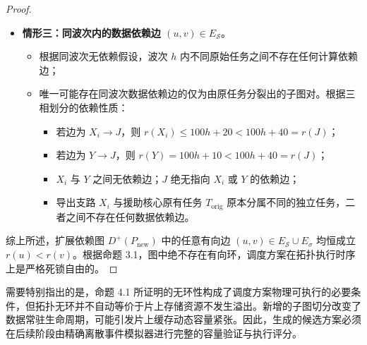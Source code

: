 \documentclass[anonymous,notoc]{gmcm2026}
\providecommand{\tightlist}{\setlength{\itemsep}{0pt}\setlength{\parskip}{0pt}}
\begin{document}
\begin{proof}
\begin{itemize}
  \begin{itemize}
  \tightlist
  \item
    在援助核心上，调度序列为 \(X_1 \to X_2 \to \cdots \to X_m \to T_{\mathrm{orig}}\)。根据标号赋值，显然有 \(r(X_1) < r(X_2) < \cdots < r(X_m) < r(T_{\mathrm{orig}}) = 100h + 30\)；
  \item
    在捐赠核心上，调度序列为 \(Y \to J\)。根据定义，\(r(Y) = 100h + 10 < r(J) = 100h + 40\)；
  \item
    其余核心在波次 \(h\) 内至多只有一个任务，不存在同波次调度边。
  \end{itemize}
\item
  \textbf{情形三：同波次内的数据依赖边 \((u, v) \in E_{\mathcal{S}}\)}。

  \begin{itemize}
  \tightlist
  \item
    根据同波次无依赖假设，波次 \(h\) 内不同原始任务之间不存在任何计算依赖边；
  \item
    唯一可能存在同波次数据依赖边的仅为由原任务分裂出的子图对。根据三相划分的依赖性质：

    \begin{itemize}
    \tightlist
    \item
      若边为 \(X_i \to J\)，则 \(r(X_i) \le 100h + 20 < 100h + 40 = r(J)\)；
    \item
      若边为 \(Y \to J\)，则 \(r(Y) = 100h + 10 < 100h + 40 = r(J)\)；
    \item
      \(X_i\) 与 \(Y\) 之间无依赖边；\(J\) 绝无指向 \(X_i\) 或 \(Y\) 的依赖边；
    \item
      导出支路 \(X_i\) 与援助核心原有任务 \(T_{\mathrm{orig}}\) 原本分属不同的独立任务，二者之间不存在任何数据依赖边。
    \end{itemize}
  \end{itemize}
\end{itemize}

综上所述，扩展依赖图 \(D^+(P_{\mathrm{new}})\) 中的任意有向边 \((u, v) \in E_{\mathcal{S}} \cup E_\sigma\) 均恒成立 \(r(u) < r(v)\)。根据命题 3.1，图中绝不存在有向环，调度方案在拓扑执行时序上是严格死锁自由的。 \end{proof}

需要特别指出的是，命题 4.1 所证明的无环性构成了调度方案物理可执行的必要条件，但拓扑无环并不自动等价于片上存储资源不发生溢出。新增的子图切分改变了数据常驻生命周期，可能引发片上缓存动态容量紧张。因此，生成的候选方案必须在后续阶段由精确离散事件模拟器进行完整的容量验证与执行评分。
\end{document}
